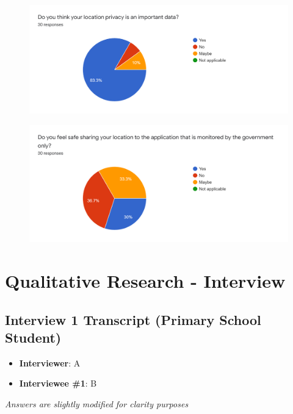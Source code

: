 \begin{appendices}
\begin{figure}[H]
    \end{figure}
    \begin{figure}[H]
      \centering
      \includegraphics[width=\linewidth]{img/Survey/Q8.png}
    \end{figure}
    \begin{figure}[H]
      \centering
      \includegraphics[width=\linewidth]{img/Survey/Q9.png}
    \end{figure}

  \section{Qualitative Research - Interview} \label{appendix:qualitative}

    \subsection{Interview 1 Transcript (Primary School Student)}
      \begin{itemize}
        \item \textbf{Interviewer}: A
        \item \textbf{Interviewee \#1}: B
      \end{itemize}
      \par \textit{Answers are slightly modified for clarity purposes}


\end{appendices}
